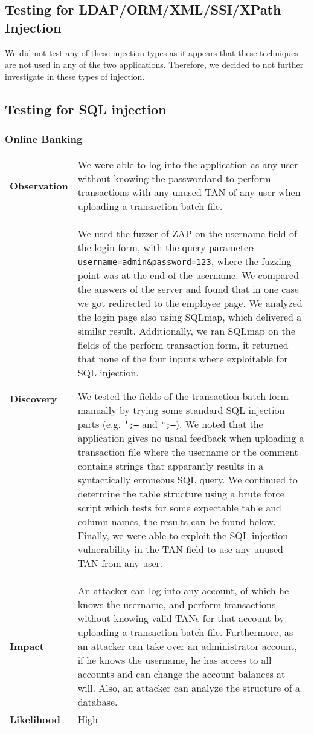 \subsection{Testing for LDAP/ORM/XML/SSI/XPath Injection}
We did not test any of these injection types as it appears that these techniques are not used in any of the two applications. Therefore, we decided to not further investigate in these types of injection.

\subsection{Testing for SQL injection}
\subsubsection*{Online Banking}

\begin{tabular}{l|p{10cm}}

\textbf{Observation} & We were able to log into the application as any user without knowing the passwordand to perform transactions with any unused TAN of any user when uploading a transaction batch file. \\
\textbf{Discovery} & We used the fuzzer of ZAP on the username field of the login form, with the query parameters \texttt{username=admin\&password=123}, where the fuzzing point was at the end of the username. We compared the answers of the server and found that in one case we got redirected to the employee page. We analyzed the login page also using SQLmap, which delivered a similar result. Additionally, we ran SQLmap on the fields of the perform transaction form, it returned that none of the four inputs where exploitable for SQL injection.

We tested the fields of the transaction batch form manually by trying some standard SQL injection parts (e.g. \texttt{';--} and \texttt{";--}). We noted that the application gives no usual feedback when uploading a transaction file where the username or the comment contains strings that apparantly results in a syntactically erroneous SQL query. We continued to determine the table structure using a brute force script which tests for some expectable table and column names, the results can be found below. Finally, we were able to exploit the SQL injection vulnerability in the TAN field to use any unused TAN from any user. \\
\textbf{Impact} & An attacker can log into any account, of which he knows the username, and perform transactions without knowing valid TANs for that account by uploading a transaction batch file. Furthermore, as an attacker can take over an administrator account, if he knows the username, he has access to all accounts and can change the account balances at will. Also, an attacker can analyze the structure of a database. \\
\textbf{Likelihood} & High \\
\end{tabular}

